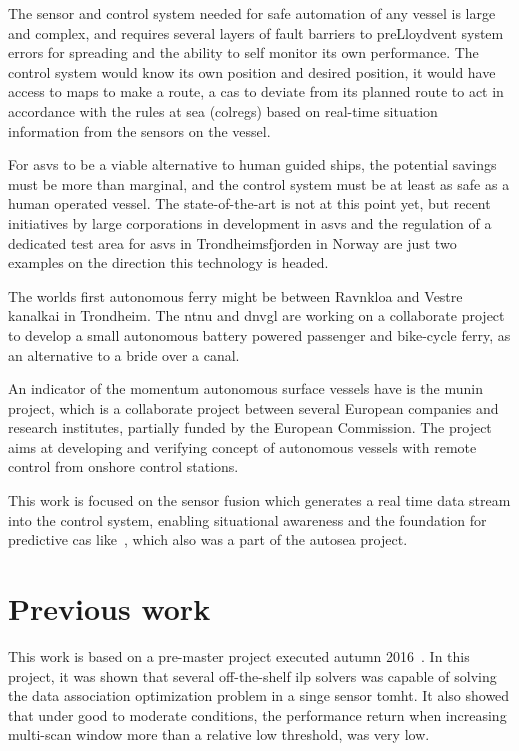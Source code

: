 The sensor and control system needed for safe automation of any vessel is large and complex, and requires several layers of fault barriers to preLloydvent system errors for spreading and the ability to self monitor its own performance. The control system would know its own position and desired position, it would have access to maps to make a route, a \gls{cas} to deviate from its planned route to act in accordance with the rules at sea (\gls{colregs}) based on real-time situation information from the sensors on the vessel.

For \glspl{asv} to be a viable alternative to human guided ships, the potential savings must be more than marginal, and the control system must be at least as safe as a human operated vessel. The state-of-the-art is not at this point yet, but recent initiatives by large corporations in development in \glspl{asv} and the regulation of a dedicated test area for \glspl{asv} in Trondheimsfjorden in Norway are just two examples on the direction this technology is headed.

The worlds first autonomous ferry might be between Ravnkloa and Vestre kanalkai in Trondheim. The \gls{ntnu} and \gls{dnvgl} are working on a collaborate project to develop a small autonomous battery powered passenger and bike-cycle ferry, as an alternative to a bride over a canal. 

An indicator of the momentum autonomous surface vessels have is the \gls{munin} project, which is a collaborate project between several European companies and research institutes, partially funded by the European Commission. The project aims at developing and verifying concept of autonomous vessels with remote control from onshore control stations.

This work is focused on the sensor fusion which generates a real time data stream into the control system, enabling situational awareness and the foundation for predictive \gls{cas} like~\cite{Hagen2017}, which also was a part of the \gls{autosea} project.

\section{Previous work}\label{sec:previous_work}
This work is based on a pre-master project executed autumn 2016~\cite[url=true]{Liland_2017}. In this project, it was shown that several off-the-shelf \gls{ilp} \glspl{solver} was capable of solving the data association optimization problem in a singe sensor \gls{tomht}. It also showed that under good to moderate conditions, the performance return when increasing multi-scan window more than a relative low threshold, was very low.

